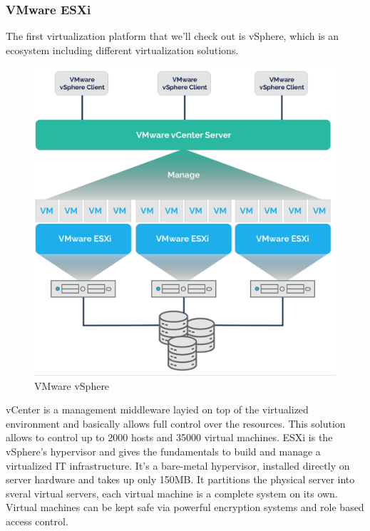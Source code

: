 \subsubsection{VMware ESXi}
The first virtualization platform that we'll check out is vSphere, which is an ecosystem including different virtualization solutions.
\begin{figure}
    \centering
    \includegraphics[scale=0.4]{Images/ESXi.png}
    \caption{VMware vSphere}
\end{figure}
vCenter is a management middleware layied on top of the virtualized environment and basically allows full control over the resources. This solution allows to control up to 2000 hosts and 35000 virtual machines. \n
ESXi is the vSphere's hypervisor and gives the fundamentals to build and manage a virtualized IT infrastructure. It's a bare-metal hypervisor, installed directly on server hardware and takes up only 150MB. It partitions the physical server into sveral virtual servers, each virtual machine is a complete system on its own. \n
Virtual machines can be kept safe via powerful encryption systems and role based access control.
